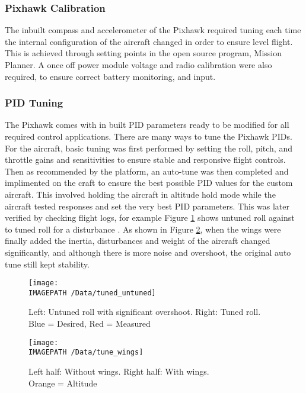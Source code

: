 \subsubsection*{Pixhawk Calibration}
The inbuilt compass and accelerometer of the Pixhawk required tuning each time the internal configuration of the aircraft changed in order to ensure level flight. This is achieved through setting points in the open source program, Mission Planner. A once off power module voltage and radio calibration were also required, to ensure correct battery monitoring, and input. 

\subsubsection*{PID Tuning}
The Pixhawk comes with in built PID parameters ready to be modified for all required control applications.  There are many ways to tune the Pixhawk PIDs. For the aircraft, basic tuning was first performed by setting the roll, pitch, and throttle gains and sensitivities to ensure stable and responsive flight controls. Then as recommended by the platform, an auto-tune was then completed and implimented on the craft to ensure the best possible PID values for the custom aircraft. This involved holding the aircraft in altitude hold mode while the aircraft tested responses and set the very best PID parameters. This was later verified by checking flight logs, for example Figure \ref{fig:tune1} shows untuned roll against to tuned roll for a disturbance . As shown in Figure \ref{fig:tune2}, when the wings were finally added the inertia, disturbances and weight of the aircraft changed significantly, and although there is more noise and overshoot, the original auto tune still kept stability. 

\begin{figure}[!h]
	\centering
	\texttt{[image: \\IMAGEPATH /Data/tuned\_untuned]}
	\caption{Left: Untuned roll with significant overshoot. Right: Tuned roll.\\Blue = Desired, Red = Measured}
	\label{fig:tune1}
\end{figure}
\begin{figure}[!h]
	\centering
	\texttt{[image: \\IMAGEPATH /Data/tune\_wings]}
	\caption{Left half: Without wings. Right half: With wings.\\ Orange = Altitude}
	\label{fig:tune2}
\end{figure}


